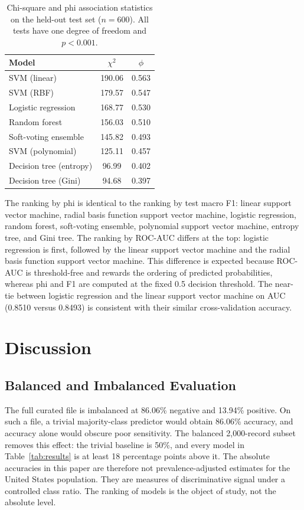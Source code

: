 \documentclass[conference]{IEEEtran}
\begin{document}
\begin{table}[!t]
\renewcommand{\arraystretch}{1.15}
\caption{Chi-square and phi association statistics on the held-out test set (\(n=600\)). All tests have one degree of freedom and \(p<0.001\).}
\label{tab:chi2}
\centering
\footnotesize
\begin{tabular}{@{}lcc@{}}
\hline
Model & \(\chi^2\) & \(\phi\) \\
\hline
SVM (linear) & 190.06 & 0.563 \\
SVM (RBF) & 179.57 & 0.547 \\
Logistic regression & 168.77 & 0.530 \\
Random forest & 156.03 & 0.510 \\
Soft-voting ensemble & 145.82 & 0.493 \\
SVM (polynomial) & 125.11 & 0.457 \\
Decision tree (entropy) & 96.99 & 0.402 \\
Decision tree (Gini) & 94.68 & 0.397 \\
\hline
\end{tabular}
\end{table}

The ranking by phi is identical to the ranking by test macro F1: linear support vector machine, radial basis function support vector machine, logistic regression, random forest, soft-voting ensemble, polynomial support vector machine, entropy tree, and Gini tree. The ranking by ROC-AUC differs at the top: logistic regression is first, followed by the linear support vector machine and the radial basis function support vector machine. This difference is expected because ROC-AUC is threshold-free and rewards the ordering of predicted probabilities, whereas phi and F1 are computed at the fixed 0.5 decision threshold. The near-tie between logistic regression and the linear support vector machine on AUC (0.8510 versus 0.8493) is consistent with their similar cross-validation accuracy.

\section{Discussion}
\label{sec:discussion}

\subsection{Balanced and Imbalanced Evaluation}

The full curated file is imbalanced at 86.06\% negative and 13.94\% positive. On such a file, a trivial majority-class predictor would obtain 86.06\% accuracy, and accuracy alone would obscure poor sensitivity. The balanced 2,000-record subset removes this effect: the trivial baseline is 50\%, and every model in Table~\ref{tab:results} is at least 18 percentage points above it. The absolute accuracies in this paper are therefore not prevalence-adjusted estimates for the United States population. They are measures of discriminative signal under a controlled class ratio. The ranking of models is the object of study, not the absolute level.
\end{document}
